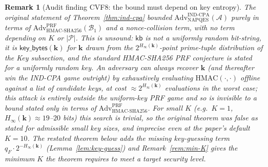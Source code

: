 \documentclass[11pt,a4paper]{article}
\newtheorem{remark}[theorem]{Remark}
\begin{document}
\begin{remark}[Audit finding CVF8: the bound must depend on key entropy]
\label{rem:cvf8}
The original statement of Theorem~\ref{thm:ind-cpa} bounded
$\mathrm{Adv}^{\mathrm{IND\text{-}CPA}}_{\mathrm{NAPQES}}(\mathcal{A})$
purely in terms of $\mathrm{Adv}^{\mathrm{PRF}}_{\mathrm{HMAC\text{-}SHA256}}(\mathcal{B}_1)$
and a nonce-collision term, with no term depending on $K$ or $|\mathcal{P}|$.
This is unsound: $\mathsf{kb}$ is not a uniformly random bit-string, it is
$\mathsf{key\_bytes}(\mathbf{k})$ for $\mathbf{k}$ drawn from the
$2^{H_\infty(\mathbf{k})}$-point prime-tuple distribution of the Key
subsection, and the standard HMAC-SHA256 PRF conjecture is stated for a
uniformly random key. An adversary can always recover $\mathbf{k}$ (and
thereafter win the IND-CPA game outright) by exhaustively evaluating
$\mathrm{HMAC}(\cdot, \cdot)$ offline against a list of candidate keys, at
cost $\approx 2^{H_\infty(\mathbf{k})}$ evaluations in the worst case; this
attack is entirely outside the uniform-key PRF game and so is invisible to
a bound stated only in terms of $\mathrm{Adv}^{\mathrm{PRF}}_{\mathrm{HMAC\text{-}SHA256}}$.
For small $K$ (e.g.\ $K=1$, $H_\infty(\mathbf{k})\approx 19$--$20$ bits)
this search is trivial, so the original theorem was false as stated for
admissible small key sizes, and imprecise even at the paper's default
$K=10$. The restated theorem below adds the missing key-guessing term
$q_F \cdot 2^{-H_\infty(\mathbf{k})}$ (Lemma~\ref{lem:key-guess}) and
Remark~\ref{rem:min-K} gives the minimum $K$ the theorem requires to meet
a target security level.
\end{remark}
\end{document}
